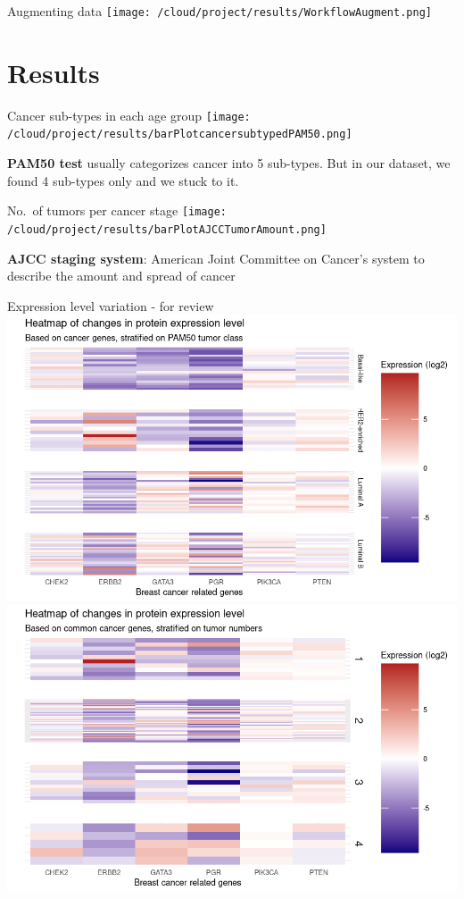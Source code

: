 \documentclass[
  12pt,
  ignorenonframetext,
]{beamer}
\begin{document}
\begin{frame}{Augmenting data}
\protect\hypertarget{augmenting-data}{}
\texttt{[image: /cloud/project/results/WorkflowAugment.png]}
\end{frame}

\hypertarget{results}{%
\section{Results}\label{results}}

\begin{frame}{Cancer sub-types in each age group}
\protect\hypertarget{cancer-sub-types-in-each-age-group}{}
\texttt{[image: /cloud/project/results/barPlotcancersubtypedPAM50.png]}

\textbf{PAM50 test} usually categorizes cancer into 5 sub-types. But in
our dataset, we found 4 sub-types only and we stuck to it.
\end{frame}

\begin{frame}{No.~of tumors per cancer stage}
\protect\hypertarget{no.-of-tumors-per-cancer-stage}{}
\texttt{[image: /cloud/project/results/barPlotAJCCTumorAmount.png]}

\textbf{AJCC staging system}: American Joint Committee on Cancer's
system to describe the amount and spread of cancer
\end{frame}

\begin{frame}{Expression level variation - for review}
\protect\hypertarget{expression-level-variation---for-review}{}
\includegraphics[width=0.49\linewidth,height=0.6\textheight]{../results/heatmapPAM50}
\includegraphics[width=0.49\linewidth,height=0.6\textheight]{../results/heatmapTumor}
\end{frame}
\end{document}

